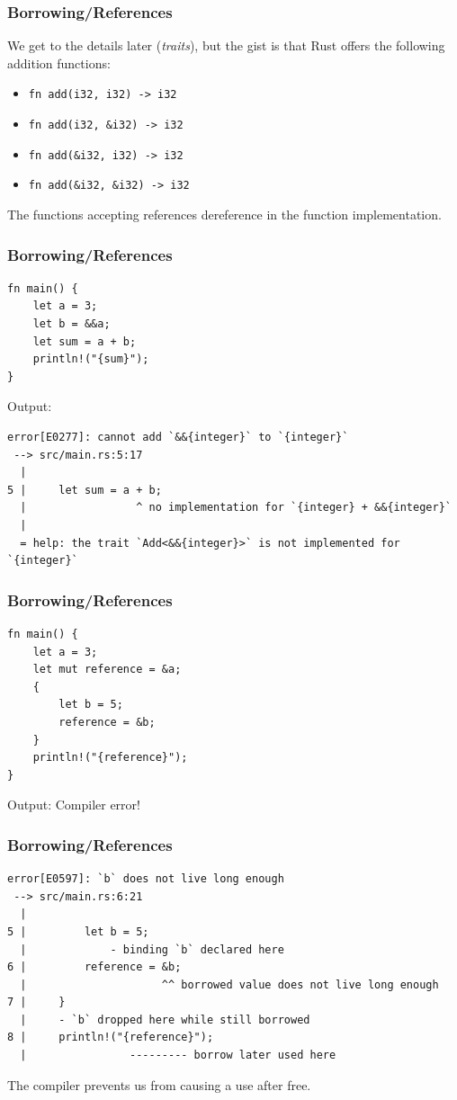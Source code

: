 \begin{frame}[fragile]
    \frametitle{Borrowing/References}
    We get to the details later (\textit{traits}), but the gist is that Rust offers the following addition functions:
    \vfill
    \begin{itemize}
        \item \texttt{fn add(i32, i32) -> i32}
        \item \texttt{fn add(i32, \&i32) -> i32}
        \item \texttt{fn add(\&i32, i32) -> i32}
        \item \texttt{fn add(\&i32, \&i32) -> i32}
    \end{itemize}
    \pause
    \vfill
    The functions accepting references dereference in the function implementation.
\end{frame}

\begin{frame}[fragile]
    \frametitle{Borrowing/References}
    \begin{verbatim}
fn main() {
    let a = 3;
    let b = &&a;
    let sum = a + b;
    println!("{sum}");
}
    \end{verbatim}
    Output:
    \pause
    \vfill
    \begin{verbatim}
error[E0277]: cannot add `&&{integer}` to `{integer}`
 --> src/main.rs:5:17
  |
5 |     let sum = a + b;
  |                 ^ no implementation for `{integer} + &&{integer}`
  |
  = help: the trait `Add<&&{integer}>` is not implemented for `{integer}`
    \end{verbatim}
\end{frame}

\begin{frame}[fragile]
    \frametitle{Borrowing/References}
    \begin{verbatim}
fn main() {
    let a = 3;
    let mut reference = &a;
    {
        let b = 5;
        reference = &b;
    }
    println!("{reference}");
}
    \end{verbatim}
    Output:
    \pause
    \vfill
    Compiler error!
\end{frame}

\begin{frame}[fragile]
    \frametitle{Borrowing/References}
    \begin{verbatim}
error[E0597]: `b` does not live long enough
 --> src/main.rs:6:21
  |
5 |         let b = 5;
  |             - binding `b` declared here
6 |         reference = &b;
  |                     ^^ borrowed value does not live long enough
7 |     }
  |     - `b` dropped here while still borrowed
8 |     println!("{reference}");
  |                --------- borrow later used here
    \end{verbatim}
    \pause
    \vfill
    The compiler prevents us from causing a use after free.
\end{frame}

